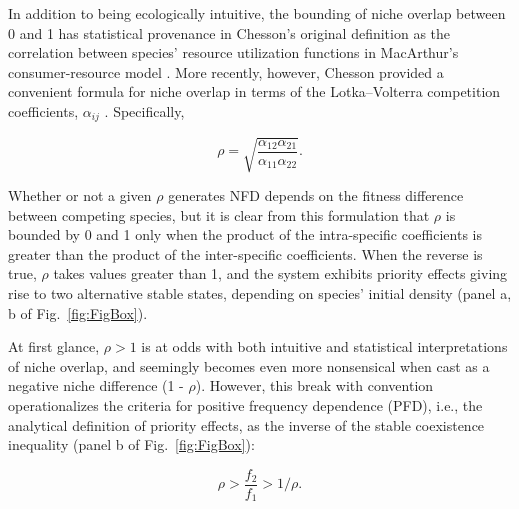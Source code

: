 In addition to being ecologically intuitive, the bounding of niche overlap between 0 and 1 has statistical provenance in Chesson's original definition as the correlation between species' resource utilization functions in MacArthur's consumer-resource model \citep{Chesson1990}. More recently, however, Chesson provided a convenient formula for niche overlap in terms of the Lotka--Volterra competition coefficients, $\alpha_{ij}$ \citep{Chesson2013ecosys}. Specifically,

\begin{equation}
\rho=\sqrt {\frac{{{\alpha_{12}}{\alpha_{21}}}}{{{\alpha_{11}}{\alpha_{22}}}}}.
\tag{3.2}\label{eq:3.2}
\end{equation}
 
\noindent Whether or not a given $\rho$ generates NFD depends on the fitness difference between competing species, but it is clear from this formulation that $\rho$ is bounded by 0 and 1 only when the product of the intra-specific coefficients is greater than the product of the inter-specific coefficients. When the reverse is true, $\rho$ takes values greater than 1, and the system exhibits priority effects giving rise to two alternative stable states, depending on species' initial density (panel a, b of Fig.~\ref{fig:FigBox}). 
\par


At first glance, $\rho>1$ is at odds with both intuitive and statistical interpretations of niche overlap, and seemingly becomes even more nonsensical when cast as a negative niche difference (1 - $\rho$). However, this break with convention operationalizes the criteria for positive frequency dependence (PFD), i.e., the analytical definition of priority effects, as the inverse of the stable coexistence inequality (panel b of Fig.~\ref{fig:FigBox}): 

\begin{equation}
\rho > \frac{f_{2}}{f_{1}} > 1/\rho.
\tag{3.3}\label{eq:3.3}
\end{equation}

